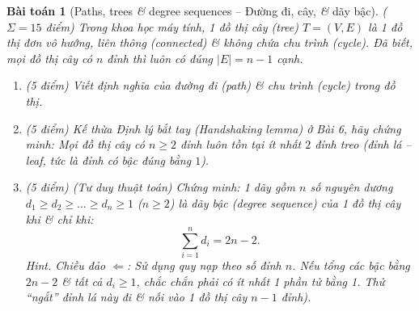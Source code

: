 \documentclass{article}
\newtheorem{baitoan}{Bài toán}
\begin{document}
\begin{baitoan}[Paths, trees {\it\&} degree sequences -- Đường đi, cây, {\it\&} dãy bậc]
	{\rm($\Sigma = 15$ điểm)} Trong khoa học máy tính, 1 đồ thị cây (tree) $T = (V, E)$ là 1 đồ thị đơn vô hướng, liên thông (connected) \& không chứa chu trình (cycle). Đã biết, mọi đồ thị cây có $n$ đỉnh thì luôn có đúng $|E| = n - 1$ cạnh.	
	\begin{enumerate}[label=(\alph*)]
		\item {\rm(5 điểm)} Viết định nghĩa của đường đi (path) \& chu trình (cycle) trong đồ thị.
		\item {\rm(5 điểm)} Kế thừa Định lý bắt tay (Handshaking lemma) ở Bài 6, hãy chứng minh: Mọi đồ thị cây có $n \ge 2$ đỉnh luôn tồn tại ít nhất $2$ đỉnh treo (đỉnh lá -- leaf, tức là đỉnh có bậc đúng bằng $1$).
		\item {\rm(5 điểm)} \emph{(Tư duy thuật toán)} Chứng minh: 1 dãy gồm $n$ số nguyên dương $d_1\ge d_2\ge\ldots\ge d_n\ge1$ ($n \ge 2$) là dãy bậc (degree sequence) của 1 đồ thị cây khi \& chỉ khi:
		\begin{equation*}
			\sum_{i = 1}^n d_i = 2n - 2.
		\end{equation*}
		{\sf Hint.} Chiều đảo $\Leftarrow$: Sử dụng quy nạp theo số đỉnh $n$. Nếu tổng các bậc bằng $2n - 2$ \& tất cả $d_i \ge 1$, chắc chắn phải có ít nhất 1 phần tử bằng 1. Thử ``ngắt'' đỉnh lá này đi \& nối vào 1 đồ thị cây $n-1$ đỉnh).
	\end{enumerate}
\end{baitoan}
\end{document}
